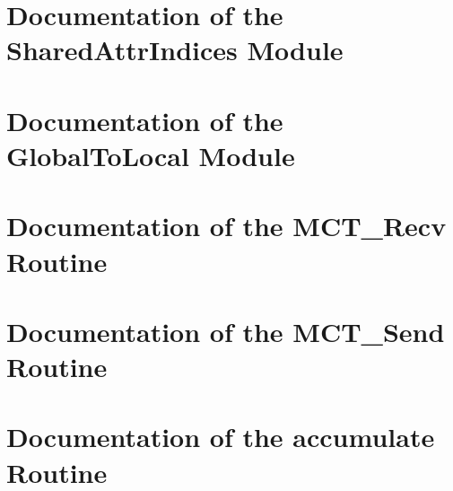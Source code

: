 \documentclass{article}
\begin{document}
\section{Documentation of the SharedAttrIndices Module}

\section{Documentation of the GlobalToLocal Module}

\section{Documentation of the MCT\_Recv Routine}

\section{Documentation of the MCT\_Send Routine}

\section{Documentation of the accumulate Routine}



 
%
\end{document}
